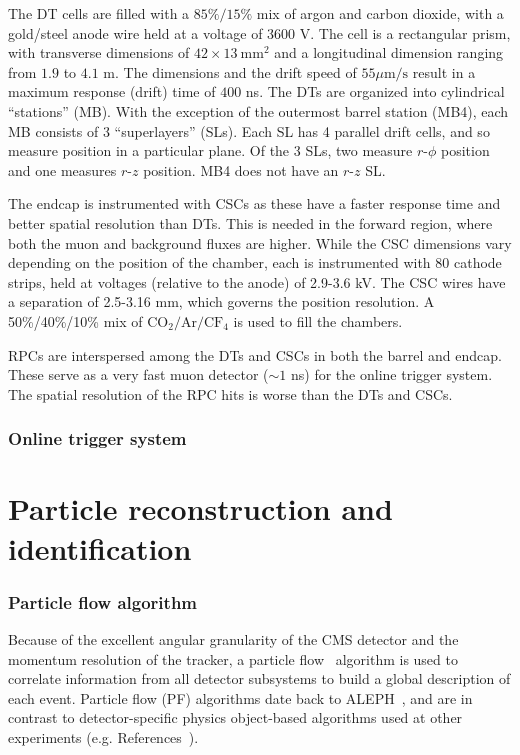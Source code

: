 The DT cells are filled with a $85\%/15\%$ mix of argon and carbon dioxide, with a gold/steel anode wire held at a voltage of $3600$ V.
The cell is a rectangular prism, with transverse dimensions of $42\times13~\mathrm{mm}^2$ and a longitudinal dimension ranging from $1.9$ to $4.1$ m.
The dimensions and the drift speed of $55\mu\mathrm{m/s}$ result in a maximum response (drift) time of $400$ ns.
The DTs are organized into cylindrical ``stations'' (MB).
With the exception of the outermost barrel station (MB4), each MB consists of 3 ``superlayers'' (SLs).
Each SL has 4 parallel drift cells, and so measure position in a particular plane.
Of the 3 SLs, two measure $r$-$\phi$ position and one measures $r$-$z$ position. 
MB4 does not have an $r$-$z$ SL.

The endcap is instrumented with CSCs as these have a faster response time and better spatial resolution than DTs.
This is needed in the forward region, where both the muon and background fluxes are higher.
While the CSC dimensions vary depending on the position of the chamber, each is instrumented with 80 cathode strips, held at voltages (relative to the anode) of 2.9-3.6 kV.
The CSC wires have a separation of 2.5-3.16 mm, which governs the position resolution.
A 50\%/40\%/10\% mix of $\mathrm{CO}_2/\mathrm{Ar}/\mathrm{CF}_4$ is used to fill the chambers.

RPCs are interspersed among the DTs and CSCs in both the barrel and endcap. 
These serve as a very fast muon detector ($\sim 1$ ns) for the online trigger system. 
The spatial resolution of the RPC hits is worse than the DTs and CSCs.

\subsubsection{Online trigger system}

\section{Particle reconstruction and identification}

\subsubsection{Particle flow algorithm}

Because of the excellent angular granularity of the CMS detector and the momentum resolution of the tracker, a particle flow~\cite{cmspf} algorithm is used to correlate information from all detector subsystems to build a global description of each event.
Particle flow (PF) algorithms date back to ALEPH~\needcite, and are in contrast to detector-specific physics object-based algorithms used at other experiments (e.g. References~\needcite).

